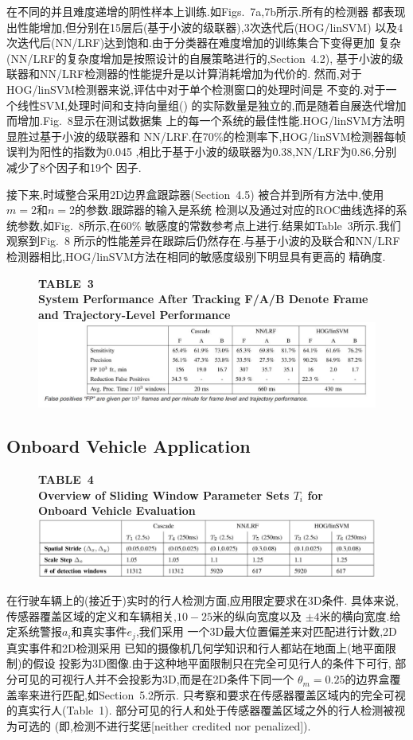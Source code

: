 \documentclass[10pt,letterpaper,journal,compsoc]{IEEEtran}
\begin{document}
在不同的并且难度递增的阴性样本上训练.如Figs.~7a,7b所示.所有的检测器
都表现出性能增加,但分别在15层后(基于小波的级联器),3次迭代后(HOG/linSVM)
以及4次迭代后(NN/LRF)达到饱和.由于分类器在难度增加的训练集合下变得更加
复杂(NN/LRF的复杂度增加是按照设计的自展策略进行的,Section~4.2),
基于小波的级联器和NN/LRF检测器的性能提升是以计算消耗增加为代价的.
然而,对于HOG/linSVM检测器来说,评估中对于单个检测窗口的处理时间是
不变的.对于一个线性SVM,处理时间和支持向量组(\cite{bib78})
的实际数量是独立的,而是随着自展迭代增加而增加.Fig.~8显示在测试数据集
上的每一个系统的最佳性能.HOG/linSVM方法明显胜过基于小波的级联器和
NN/LRF.在70\%的检测率下,HOG/linSVM检测器每帧误判为阳性的指数为0.045
,相比于基于小波的级联器为0.38,NN/LRF为0.86,分别减少了8个因子和19个
因子.

接下来,时域整合采用2D边界盒跟踪器(Section~4.5)
被合并到所有方法中,使用$m=2$和$n=2$的参数.跟踪器的输入是系统
检测以及通过对应的ROC曲线选择的系统参数,如Fig.~8所示,在60\%
敏感度的常数参考点上进行.结果如Table~3所示.我们观察到Fig.~8
所示的性能差异在跟踪后仍然存在.与基于小波的及联合和NN/LRF
检测器相比,HOG/linSVM方法在相同的敏感度级别下明显具有更高的
精确度.
\begin{figure}[!t]
\centering
\large{\textbf{TABLE~3\\
System Performance After Tracking F/A/B Denote Frame and Trajectory-Level Performance
}}
\includegraphics[width=7in]{table3.JPG}
\end{figure}
\subsection{Onboard Vehicle Application}
\begin{figure}[!b]
\centering
\large{\textbf{TABLE~4\\
Overview of Sliding Window Parameter Sets $T_i$ for Onboard Vehicle Evaluation
}}
\includegraphics[width=7in]{table4.JPG}
\end{figure}
在行驶车辆上的(接近于)实时的行人检测方面,应用限定要求在3D条件.
具体来说,传感器覆盖区域的定义和车辆相关,$10-25$米的纵向宽度以及
$\pm4$米的横向宽度.给定系统警报$a_i$和真实事件$e_j$,我们采用
一个3D最大位置偏差来对匹配进行计数,2D真实事件和2D检测采用
已知的摄像机几何学知识和行人都站在地面上(地平面限制)的假设
投影为3D图像.由于这种地平面限制只在完全可见行人的条件下可行,
部分可见的可视行人并不会投影为3D,而是在2D条件下同一个
$\theta_m=0.25$的边界盒覆盖率来进行匹配,如Section~5.2所示.
只考察和要求在传感器覆盖区域内的完全可视的真实行人(Table~1).
部分可见的行人和处于传感器覆盖区域之外的行人检测被视为可选的
(即,检测不进行奖惩[neither credited nor penalized]).
\end{document}
